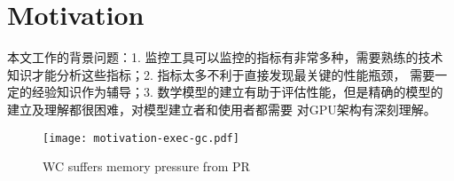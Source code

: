 \section{Motivation}
\label{sec:motivation}

本文工作的背景问题：1. 监控工具可以监控的指标有非常多种，需要熟练的技术知识才能分析这些指标；2. 指标太多不利于直接发现最关键的性能瓶颈，
需要一定的经验知识作为辅导；3. 数学模型的建立有助于评估性能，但是精确的模型的建立及理解都很困难，对模型建立者和使用者都需要
对GPU架构有深刻理解。

\begin{figure}[!t]
\centering
\texttt{[image: motivation-exec-gc.pdf]}
\caption{WC suffers memory pressure from PR}
\label{fig:memorypressure}
\end{figure}

 
